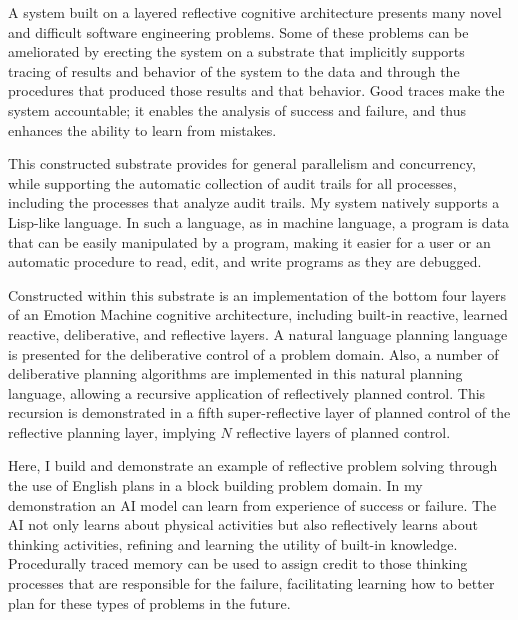 A system built on a layered reflective cognitive architecture presents
many novel and difficult software engineering problems.  Some of these
problems can be ameliorated by erecting the system on a substrate that
implicitly supports tracing of results and behavior of the system to
the data and through the procedures that produced those results and
that behavior.  Good traces make the system accountable; it enables
the analysis of success and failure, and thus enhances the ability to
learn from mistakes.

This constructed substrate provides for general parallelism and
concurrency, while supporting the automatic collection of audit trails
for all processes, including the processes that analyze audit trails.
My system natively supports a Lisp-like language.  In such a language,
as in machine language, a program is data that can be easily
manipulated by a program, making it easier for a user or an automatic
procedure to read, edit, and write programs as they are debugged.

Constructed within this substrate is an implementation of the bottom
four layers of an Emotion Machine cognitive architecture, including
built-in reactive, learned reactive, deliberative, and reflective
layers.  A natural language planning language is presented for the
deliberative control of a problem domain.  Also, a number of
deliberative planning algorithms are implemented in this natural
planning language, allowing a recursive application of reflectively
planned control.  This recursion is demonstrated in a fifth
super-reflective layer of planned control of the reflective planning
layer, implying $N$ reflective layers of planned control.

Here, I build and demonstrate an example of reflective problem solving
through the use of English plans in a block building problem domain.
In my demonstration an AI model can learn from experience of success
or failure.  The AI not only learns about physical activities but also
reflectively learns about thinking activities, refining and learning
the utility of built-in knowledge.  Procedurally traced memory can be
used to assign credit to those thinking processes that are responsible
for the failure, facilitating learning how to better plan for these
types of problems in the future.
